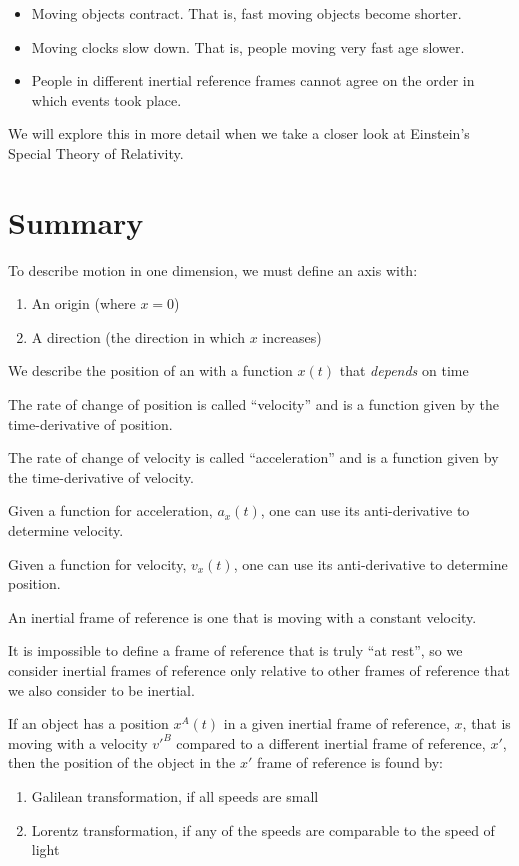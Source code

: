 \begin{itemize}
\item Moving objects contract. That is, fast moving objects become shorter.
\item Moving clocks slow down. That is, people moving very fast age slower.
\item People in different inertial reference frames cannot agree on the order in which events took place. 
\end{itemize}
We will explore this in more detail when we take a closer look at Einstein's Special Theory of Relativity.

\newpage
\section{Summary}
\vspace{1cm}
\begin{chapterSummary}
\item To describe motion in one dimension, we must define an axis with:
\begin{enumerate}
\item An origin (where $x=0$)
\item A direction (the direction in which $x$ increases)
\end{enumerate}
\item We describe the position of an with a function $x(t)$ that \textit{depends} on time
\item The rate of change of position is called ``velocity'' and is a function given by the time-derivative of position.
\item The rate of change of velocity is called ``acceleration'' and is a function given by the time-derivative of velocity.
\item Given a function for acceleration, $a_x(t)$, one can use its anti-derivative to determine velocity.
\item Given a function for velocity, $v_x(t)$, one can use its anti-derivative to determine position.
\item An inertial frame of reference is one that is moving with a constant velocity.
\item It is impossible to define a frame of reference that is truly ``at rest'', so we consider inertial frames of reference only relative to other frames of reference that we also consider to be inertial.
\item If an object has a position $x^A(t)$ in a given inertial frame of reference, $x$, that is moving with a velocity $v'^B$ compared to a different inertial frame of reference, $x'$, then the position of the object in the $x'$ frame of reference is found by:
\begin{enumerate}
\item Galilean transformation, if all speeds are small
\item Lorentz transformation, if any of the speeds are comparable to the speed of light
\end{enumerate}
\end{chapterSummary}
